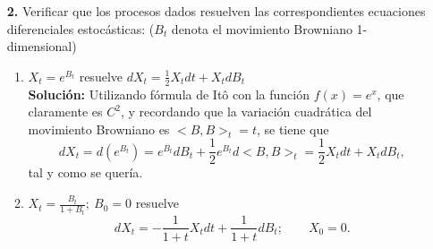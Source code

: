 \documentclass[letterpaper]{article}
\renewcommand{\to}{\rightarrow}
\newcommand{\E}{\mathbb{E}}
\renewcommand{\P}{\mathbb{P}}
\newcommand{\1}{\mathds{1}}
\theoremstyle{definition}
\theoremstyle{definition}
\theoremstyle{definition}
\theoremstyle{definition}
\theoremstyle{definition}
\begin{document}
\begin{enumerate}
\begin{proof}
            De aquí se sigue que , como $Y_t^{(n)}\xrightarrow[n\to\infty]{}X_t$ uniformemente en $[0,T]$ y casi seguramente en $\P$, entonces por 
            la convergencia en $L^2$ y el Lema de Fatou aplicado dos veces,
            \begin{align*}
                    \E\left[\int_{0}^{T}(X_t-Y_t^{(n)})^2dt\right]&= \E\left[\int_{0}^{T}\liminf_{m\to \infty}(Y_t^{(m)}-Y_t^{(n)})^2dt\right]\\
                    &\leq \E\left[\liminf_{m\to \infty}\int_{0}^{T}(Y_t^{(m)}-Y_t^{(n)})^2dt\right]\\
                    &\leq \liminf_{m\to\infty}\E\left[\int_{0}^{T}(Y_t^{(m)}-Y_t^{(n)})^2dt\right]\\
                    &\leq \limsup_{m\to \infty}\E\left[\int_{0}^{T}(Y_t^{(m)}-Y_t^{(n)})^2dt\right]
            \end{align*}
            y esta última expresión tiende a 0 conforme $n$ tiende a infinito. Finalmente, expandiendo 
            $X_t$ y $Y_t^{(n)}$, se sigue de la isometría de Itô que
            \[
                \int_{0}^{t}\sigma(s,Y_s^{(n)})dB_s\to \int_0^{t}\sigma(s,X_s)dB_s
            \]
            y de la desigualdad de Hölder que 
            \[
            \int_0^tb(s,Y_s^{(n)})\to \int_{0}^{t}b(s,X_s)ds.    
            \]
            Ambos límites en el sentido $L^2$. Por lo tanto, tomando el límite en el sentido integral 
            de \eqref{eq7}, se sigue que $X_t$ cumple $dX_t=b(t,X_t)dt+\sigma(t,X_t)dB_t$.
     \end{proof}
     

    \item[\textbf{2.}] Verificar que los procesos dados resuelven las correspondientes ecuaciones diferenciales estocásticas:
     ($B_t$ denota el movimiento Browniano 1-dimensional)
     \begin{enumerate}
        \item $X_t=e^{B_t}$ resuelve $dX_t=\frac{1}{2}X_tdt+X_tdB_t$\\
        
        \textbf{Solución:} Utilizando fórmula de Itô con la función $f(x)=e^{x}$, que claramente es 
        $C^2$, y recordando que la variación cuadrática del movimiento Browniano es $<B,B>_t=t$, se tiene que 
        \[
        dX_t=d(e^{B_t})=e^{B_t}dB_t+\frac{1}{2}e^{B_t}d<B,B>_t=\frac{1}{2}X_tdt +X_tdB_t,   
        \]
        tal y como se quería.
        \item $X_t=\frac{B_t}{1+B_t}; \ B_0=0$ resuelve 
        \[
        dX_t=-\frac{1}{1+t}X_tdt+\frac{1}{1+t}dB_t; \qquad X_0=0.    
        \]
        

\end{enumerate}
\end{enumerate}
\end{document}

